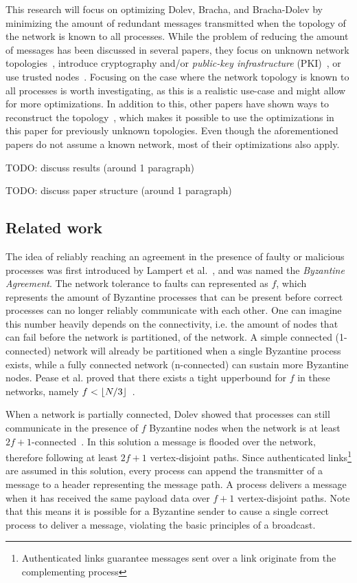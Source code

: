 This research will focus on optimizing Dolev, Bracha, and Bracha-Dolev by minimizing the amount of redundant messages transmitted when the topology of the network is known to all processes. While the problem of reducing the amount of messages has been discussed in several papers, they focus on unknown network topologies~\cite{dolev-improvement,bonomi2019multihop,bonomi2021practical}, introduce cryptography and/or \textit{public-key infrastructure} (PKI)~\cite{signatures-crypo-1,pki-crypto-2}, or use trusted nodes~\cite{using-tee}. Focusing on the case where the network topology is known to all processes is worth investigating, as this is a realistic use-case and might allow for more optimizations. In addition to this, other papers have shown ways to reconstruct the topology~\cite{topology-discovery}, which makes it possible to use the optimizations in this paper for previously unknown topologies.
Even though the aforementioned papers do not assume a known network, most of their optimizations also apply.

TODO: discuss results (around 1 paragraph)

TODO: discuss paper structure (around 1 paragraph)

\subsection*{Related work}
The idea of reliably reaching an agreement in the presence of faulty or malicious processes was first introduced by Lampert et al.~\citationneeded, and was named the \textit{Byzantine Agreement}. The network tolerance to faults can represented as $f$, which represents the amount of Byzantine processes that can be present before correct processes can no longer reliably communicate with each other. One can imagine this number heavily depends on the connectivity, i.e. the amount of nodes that can fail before the network is partitioned, of the network. A simple connected (1-connected) network will already be partitioned when a single Byzantine process exists, while a fully connected network (n-connected) can sustain more Byzantine nodes. Pease et al. proved that there exists a tight upperbound for $f$ in these networks, namely $f < \lfloor N/3\rfloor$~\citationneeded.

When a network is partially connected, Dolev showed that processes can still communicate in the presence of $f$ Byzantine nodes when the network is at least $2f+1$-connected~\cite{dolev}. In this solution a message is flooded over the network, therefore following at least $2f+1$ vertex-disjoint paths. Since authenticated links\footnote{Authenticated links guarantee messages sent over a link originate from the complementing process} are assumed in this solution, every process can append the transmitter of a message to a header representing the message path. A process delivers a message when it has received the same payload data over $f+1$ vertex-disjoint paths. Note that this means it is possible for a Byzantine sender to cause a single correct process to deliver a message, violating the basic principles of a broadcast.

